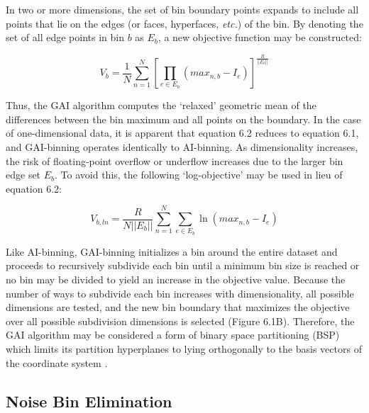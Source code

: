 \begin{doublespace}
In two or more dimensions, the set of bin boundary points expands to include
all points that lie on the edges (or faces, hyperfaces, {\it etc.}) of the bin.
By denoting the set of all edge points in bin $b$ as $E_b$, a new objective
function may be constructed:

\begin{equation}
V_b = \frac{1}{N}
  \sum_{n=1}^N \left[
    \prod_{e \in E_b} (max_{n,b} - I_e)
  \right]^\frac{R}{||E_b||}
\end{equation}

Thus, the GAI algorithm computes the `relaxed' geometric mean of the
differences between the bin maximum and all points on the boundary. In the
case of one-dimensional data, it is apparent that equation 6.2 reduces to
equation 6.1, and GAI-binning operates identically to AI-binning. As
dimensionality increases, the risk of floating-point overflow or underflow
increases due to the larger bin edge set $E_b$. To avoid this, the following
`log-objective' may be used in lieu of equation 6.2:

\begin{equation}
V_{b,ln} = \frac{R}{N ||E_b||}
  \sum_{n=1}^N \sum_{e \in E_b}
    \ln(max_{n,b} - I_e)
\end{equation}

Like AI-binning, GAI-binning initializes a bin around the entire dataset and
proceeds to recursively subdivide each bin until a minimum bin size is reached
or no bin may be divided to yield an increase in the objective value. Because
the number of ways to subdivide each bin increases with dimensionality, all
possible dimensions are tested, and the new bin boundary that maximizes the
objective over all possible subdivision dimensions is selected (Figure 6.1B).
Therefore, the GAI algorithm may be considered a form of binary space
partitioning (BSP) which limits its partition hyperplanes to lying orthogonally
to the basis vectors of the coordinate system \cite{deberg2000}.
\end{doublespace}

\subsection{Noise Bin Elimination}

